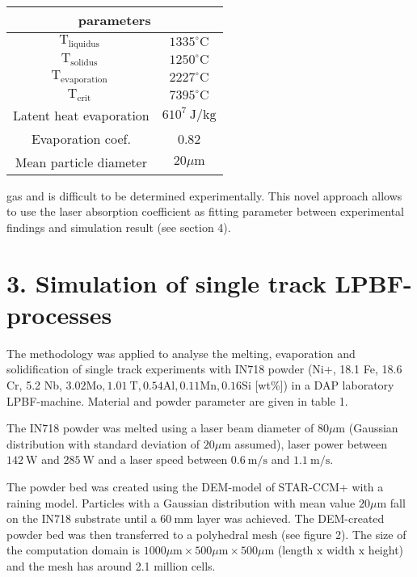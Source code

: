 \documentclass[10pt]{article}
\begin{document}
\begin{center}
\begin{tabular}{cc}
\multicolumn{2}{c}{parameters} \\
\hline
$\mathrm{T}_{\text {liquidus }}$ & $1335^{\circ} \mathrm{C}$ \\
$\mathrm{T}_{\text {solidus }}$ & $1250^{\circ} \mathrm{C}$ \\
$\mathrm{T}_{\text {evaporation }}$ & $2227^{\circ} \mathrm{C}$ \\
$\mathrm{T}_{\text {crit }}$ & $7395^{\circ} \mathrm{C}$ \\
Latent heat evaporation & $610^{7} \mathrm{~J} / \mathrm{kg}$ \\
Evaporation coef. & 0.82 \\
Mean particle diameter & $20 \mu \mathrm{m}$ \\
\hline
\end{tabular}
\end{center}

gas and is difficult to be determined experimentally. This novel approach allows to use the laser absorption coefficient as fitting parameter between experimental findings and simulation result (see section 4).

\section*{3. Simulation of single track LPBF-processes}
The methodology was applied to analyse the melting, evaporation and solidification of single track experiments with IN718 powder (Ni+, 18.1 Fe, 18.6 Cr, 5.2 Nb, $3.02 \mathrm{Mo}, 1.01 \mathrm{~T}, 0.54 \mathrm{Al}, 0.11 \mathrm{Mn}, 0.16 \mathrm{Si}$ [wt\%]) in a DAP laboratory LPBF-machine. Material and powder parameter are given in table 1.

The IN718 powder was melted using a laser beam diameter of $80 \mu \mathrm{m}$ (Gaussian distribution with standard deviation of $20 \mu \mathrm{m}$ assumed), laser power between $142 \mathrm{~W}$ and $285 \mathrm{~W}$ and a laser speed between $0.6 \mathrm{~m} / \mathrm{s}$ and $1.1 \mathrm{~m} / \mathrm{s}$.

The powder bed was created using the DEM-model of STAR-CCM+ with a raining model. Particles with a Gaussian distribution with mean value $20 \mu \mathrm{m}$ fall on the IN718 substrate until a $60 \mathrm{~mm}$ layer was achieved. The DEM-created powder bed was then transferred to a polyhedral mesh (see figure 2). The size of the computation domain is $1000 \mu \mathrm{m} \times 500 \mu \mathrm{m} \times 500 \mu \mathrm{m}$ (length $\mathrm{x}$ width $\mathrm{x}$ height) and the mesh has around 2.1 million cells.
\end{document}
